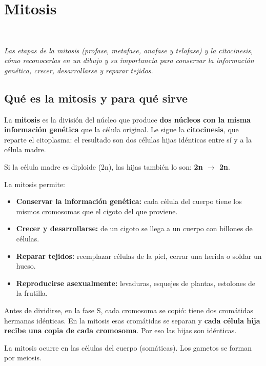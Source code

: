 \section[Mitosis]{Mitosis}
\modcomun\ \ {\color{gris}\itshape Las etapas de la mitosis (profase, metafase, anafase y telofase) y la citocinesis, cómo reconocerlas en un dibujo y su importancia para conservar la información genética, crecer, desarrollarse y reparar tejidos.\par}
\subsection{Qué es la mitosis y para qué sirve}
La \textbf{mitosis} es la división del núcleo que produce \textbf{dos núcleos con la misma información genética} que la célula original. Le sigue la \textbf{citocinesis}, que reparte el citoplasma: el resultado son dos células hijas idénticas entre sí y a la célula madre.

 

Si la célula madre es diploide (2n), las hijas también lo son: \textbf{2n \ensuremath{\rightarrow} 2n}.

 

La mitosis permite:

 
\begin{itemize}
  \item \textbf{Conservar la información genética:} cada célula del cuerpo tiene los mismos cromosomas que el cigoto del que proviene.
  \item \textbf{Crecer y desarrollarse:} de un cigoto se llega a un cuerpo con billones de células.
  \item \textbf{Reparar tejidos:} reemplazar células de la piel, cerrar una herida o soldar un hueso.
  \item \textbf{Reproducirse asexualmente:} levaduras, esquejes de plantas, estolones de la frutilla.
\end{itemize}
  
\begin{clave} Antes de dividirse, en la fase S, cada cromosoma se copió: tiene dos cromátidas hermanas idénticas. En la mitosis esas cromátidas se separan y \textbf{cada célula hija recibe una copia de cada cromosoma}. Por eso las hijas son idénticas.\end{clave}
 
\begin{clave}[{Recuerda}] La mitosis ocurre en las células del cuerpo (somáticas). Los gametos se forman por meiosis.\end{clave}
